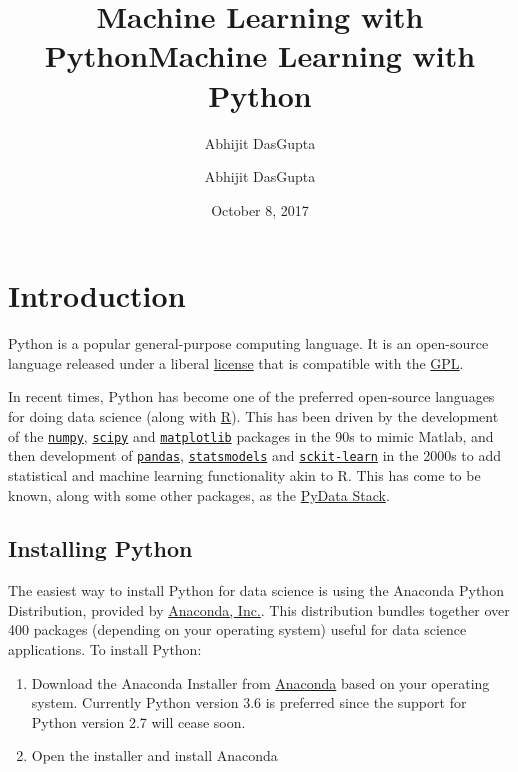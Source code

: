 \documentclass[a4paper,]{scrartcl}
\title{Machine Learning with Python}
\author{Abhijit DasGupta}
\date{October 8, 2017}
\title{Machine Learning with Python}
\author{Abhijit DasGupta}
\providecommand{\tightlist}{%
  \setlength{\itemsep}{0pt}\setlength{\parskip}{0pt}}
\begin{document}




{
\setcounter{tocdepth}{3}
\tableofcontents
}
\section{Introduction}\label{introduction}

Python is a popular general-purpose computing language. It is an
open-source language released under a liberal
\href{https://docs.python.org/3/license.html}{license} that is
compatible with the
\href{https://www.gnu.org/licenses/gpl-3.0.en.html}{GPL}.

In recent times, Python has become one of the preferred open-source
languages for doing data science (along with
\href{http://www.r-project.org}{R}). This has been driven by the
development of the \href{http://www.numpy.org}{\texttt{numpy}},
\href{http://www.scipy.org}{\texttt{scipy}} and
\href{http://matplotlib.org}{\texttt{matplotlib}} packages in the 90s to
mimic Matlab, and then development of
\href{http://pandas.pydata.org}{\texttt{pandas}},
\href{http://www.statsmodels.org}{\texttt{statsmodels}} and
\href{http://scikit-learn.org}{\texttt{sckit-learn}} in the 2000s to add
statistical and machine learning functionality akin to R. This has come
to be known, along with some other packages, as the
\href{https://pydata.org/downloads.html}{PyData Stack}.

\subsection{Installing Python}\label{installing-python}

The easiest way to install Python for data science is using the Anaconda
Python Distribution, provided by
\href{https://www.anaconda.com/}{Anaconda, Inc.}. This distribution
bundles together over 400 packages (depending on your operating system)
useful for data science applications. To install Python:

\begin{enumerate}
\def\labelenumi{\arabic{enumi}.}
\tightlist
\item
  Download the Anaconda Installer from
  \href{https://www.anaconda.com/download}{Anaconda} based on your
  operating system. Currently Python version 3.6 is preferred since the
  support for Python version 2.7 will cease soon.
\item
  Open the installer and install Anaconda
\end{enumerate}
\end{document}
